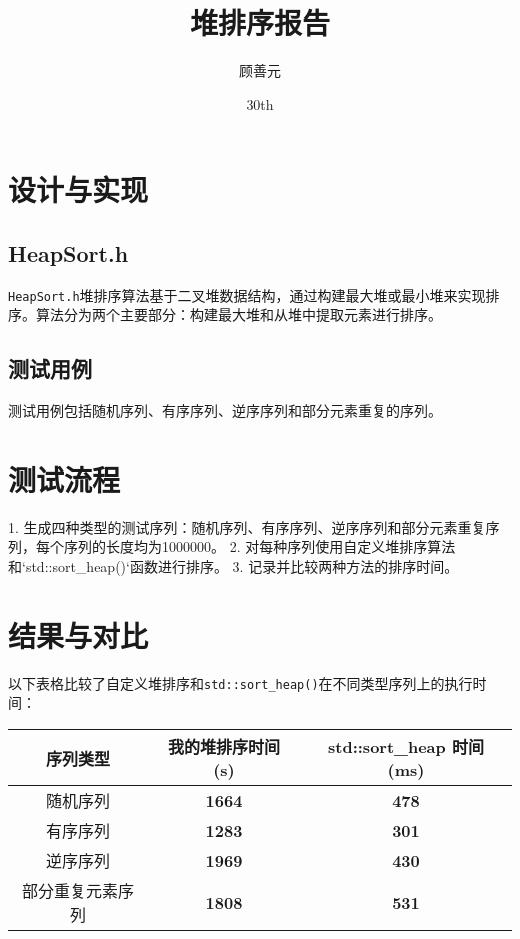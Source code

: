 \documentclass{article}
\title{堆排序报告}
\author{顾善元}
\date{\Nov 30th}
\begin{document}
\maketitle

\section{设计与实现}
\subsection{HeapSort.h}
\texttt{HeapSort.h}堆排序算法基于二叉堆数据结构，通过构建最大堆或最小堆来实现排序。算法分为两个主要部分：构建最大堆和从堆中提取元素进行排序。

\subsection{测试用例}
测试用例包括随机序列、有序序列、逆序序列和部分元素重复的序列。

\section{测试流程}
1. 生成四种类型的测试序列：随机序列、有序序列、逆序序列和部分元素重复序列，每个序列的长度均为1000000。
2. 对每种序列使用自定义堆排序算法和`std::sort_heap()`函数进行排序。
3. 记录并比较两种方法的排序时间。

\section{结果与对比}
以下表格比较了自定义堆排序和\texttt{std::sort\_heap()}在不同类型序列上的执行时间：

\begin{center}
\begin{tabular}{|c|c|c|}
\hline
\textbf{序列类型} & \textbf{我的堆排序时间 (s)} & \textbf{std::sort\_heap 时间 (ms)} \\
\hline
随机序列 & \textbf{1664} & \textbf{478} \\
有序序列 & \textbf{1283} & \textbf{301} \\
逆序序列 & \textbf{1969} & \textbf{430} \\
部分重复元素序列 & \textbf{1808} & \textbf{531} \\
\hline
\end{tabular}
\end{center}
\end{document}

